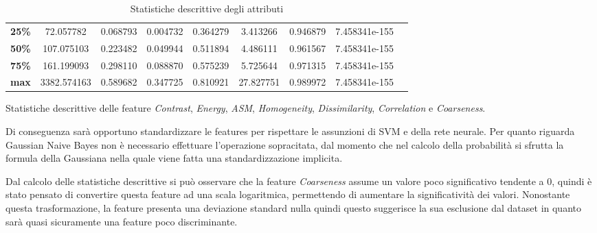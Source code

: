 \begin{table}[!ht]
\begin{subtable}[h]{1\textwidth}
{\begin{tabular}{c|c c c c c c c c}
                        \textbf{25\%}                                             & 72.057782         & 0.068793        & 0.004732     & 0.364279             & 3.413266               & 0.946879             & 7.458341e-155       \\
                        \textbf{50\%}                                             & 107.075103        & 0.223482        & 0.049944     & 0.511894             & 4.486111               & 0.961567             & 7.458341e-155       \\
                        \textbf{75\%}                                             & 161.199093        & 0.298110        & 0.088870     & 0.575239             & 5.725644               & 0.971315             & 7.458341e-155       \\
                        \textbf{max}                                              & 3382.574163       & 0.589682        & 0.347725     & 0.810921             & 27.827751              & 0.989972             & 7.458341e-155       \\ \hline
                  \end{tabular}}
            \caption{Statistiche descrittive delle feature \textit{Contrast}, \textit{Energy}, \textit{ASM}, \textit{Homogeneity}, \textit{Dissimilarity}, \textit{Correlation} e \textit{Coarseness}.}
            \label{tab:secondameta}
      \end{subtable}
      \caption{Statistiche descrittive degli attributi}
      \label{tab:desc-stat}
\end{table}

Di conseguenza sarà opportuno standardizzare le features per rispettare le
assunzioni di SVM e della rete neurale. Per quanto riguarda Gaussian Naive
Bayes non è necessario effettuare l'operazione sopracitata, dal momento che nel
calcolo della probabilità si sfrutta la formula della Gaussiana nella quale
viene fatta una standardizzazione implicita.

Dal calcolo delle statistiche descrittive si può osservare che la feature
\textit{Coarseness} assume un valore poco significativo tendente a $0$, quindi è
stato pensato di convertire questa feature ad una scala logaritmica, permettendo
di aumentare la significatività dei valori. Nonostante questa trasformazione,
la feature presenta una deviazione standard nulla quindi questo suggerisce la
sua esclusione dal dataset in quanto sarà quasi sicuramente una feature poco
discriminante.

